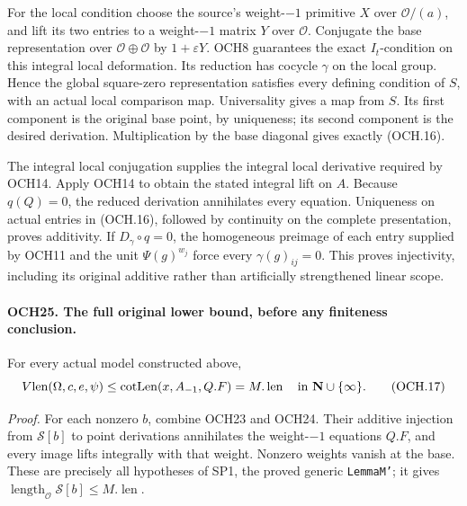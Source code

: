 \documentclass[11pt,a4paper]{article}
\numberwithin{equation}{section}
\theoremstyle{remark}\newtheorem{remark}[theorem]{Remark}
\begin{document}
For the local condition choose the source's weight-\(-1\)
primitive \(X\) over \(\mathcal O/(a)\), and lift its two
entries to a weight-\(-1\) matrix \(Y\) over
\(\mathcal O\).  Conjugate the base representation over
\(\mathcal O\oplus\mathcal O\) by \(1+\varepsilon Y\).
OCH8 guarantees the exact \(I_t\)-condition on this integral
local deformation.  Its reduction has cocycle \(\gamma\)
on the local group.  Hence the global square-zero representation
satisfies every defining condition of \(S\), with an actual
local comparison map.  Universality gives a map from \(S\).
Its first component is the original base point, by uniqueness;
its second component is the desired derivation.  Multiplication
by the base diagonal gives exactly (OCH.16).

The integral local conjugation supplies the integral local derivative
required by OCH14.  Apply OCH14 to obtain the stated integral
lift on \(A\).  Because \(q(Q)=0\), the reduced derivation
annihilates every equation.  Uniqueness on actual entries in
(OCH.16), followed by continuity on the complete presentation,
proves additivity.  If \(D_\gamma\circ q=0\), the homogeneous
preimage of each entry supplied by OCH11 and the unit
\(\Psi(g)^{w_j}\) force every \(\gamma(g)_{ij}=0\).
This proves injectivity, including its original additive rather
than artificially strengthened linear scope.

\paragraph{OCH25. The full original lower bound, before any finiteness conclusion.}
\label{claim:OCH25}
For every actual model constructed above,
\[
             V\!\operatorname{len}(\Omega,c,e,\psi)
          \le \operatorname{cotLen}(x,A_{-1},Q.F)=M.\operatorname{len}
                   \quad\hbox{in }\mathbf N\cup\{\infty\}.
 \tag{OCH.17}
\]

\emph{Proof.}
For each nonzero \(b\), combine OCH23 and OCH24.  Their
additive injection from \(\mathcal S[b]\) to point derivations
annihilates the weight-\(-1\) equations \(Q.F\), and every
image lifts integrally with that weight.  Nonzero weights vanish
at the base.  These are precisely all hypotheses of SP1, the
proved generic \texttt{Lemma\allowbreak M'}; it gives
\(\operatorname{length}_{\mathcal O}\mathcal S[b]\le M.\operatorname{len}\).
\end{document}
